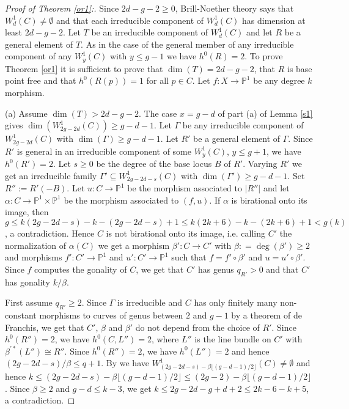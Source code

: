 \documentclass{amsart}
\theoremstyle{plain}
\theoremstyle{definition}
\begin{document}
\begin{proof}[Proof of Theorem \ref{or1}:]
Since $2d-g-2\ge 0$, Brill-Noether theory says that $W^1_d({C}) \ne \emptyset$ and that each irreducible component of $W^1_d({C})$ has dimension at least $2d-g-2$. Let $T$ be an irreducible component of $W^1_d({C})$ and let $R$ be a general element of $T$. As in the case of the general member of any irreducible component of any
$W^1_y({C})$ with $y\le g-1$ we have $h^0({R}) =2$. To prove Theorem \ref{or1} it is sufficient to prove that $\dim (T)=2d-g-2$, that $R$ is base point free and that $h^0(R({p}))=1$ for all $p\in C$. Let $f: X\to \mathbb {P}^1$ be any degree $k$ morphism.


\quad (a) Assume $\dim (T) > 2d-g-2$. The case $x=g-d$ of part (a) of Lemma \ref{s1} gives $\dim (W^1_{2g-2d}({C})) \ge g-d-1$. Let $\Gamma$ be any irreducible component of $W^1_{2g-2d}({C})$ with $\dim (\Gamma)
\ge g-d-1$. Let $R'$ be a general element of $\Gamma $. Since $R'$ is general in an irreducible component of some $W^1_y({C})$, $y\le g+1$, we have $h^0(R') =2$.
Let $s\ge 0$ be the degree of the base locus $B$
of $R'$. Varying $R'$ we get an irreducible family $\Gamma '\subseteq W^1_{2g-2d-s}({C})$ with $\dim (\Gamma ') \ge g-d-1$. Set $R'':= R'(-B)$. Let $u: C\to \mathbb {P}^1$ be the morphism associated
to $|R''|$ and let $\alpha : C\to \mathbb {P}^1\times \mathbb {P}^1$ be the morphism associated to $(f,u)$. If $\alpha$ is birational onto its image,
then $g\le k(2g-2d-s) -k-(2g-2d-s) +1 \le k(2k+6)-k-(2k+6)+1 <g(k)$, a contradiction. 
Hence $C$ is not birational onto its image, i.e. calling $C'$ the normalization of $\alpha ({C})$ we get a morphism $\beta ': C\to C'$ with $\beta : =\deg (\beta ')\ge 2$ and morphisms $f': C'\to \mathbb {P}^1$ and $u': C'\to \mathbb {P}^1$ such that $f = f'\circ \beta '$ and $u = u'\circ \beta '$. Since $f$ computes the gonality of $C$, we get that $C'$ has genus $q_{R'}>0$ and
that $C'$ has gonality $k/\beta$. 


First assume $q_{R'} \ge 2$. Since $\Gamma$ is irreducible and $C$ has only finitely many non-constant morphisms to curves of genus between $2$ and $g-1$ by a theorem of de Franchis, we get that
$C'$, $\beta $ and $\beta '$ do not depend from the choice of $R'$. Since $h^0(R'')=2$, we have $h^0(C,L'')=2$, where $L''$ is the line bundle on $C'$ with $\beta ^{'\ast }(L'')\cong R''$.
Since $h^0(R'')=2$, we have $h^0(L'') =2$ and hence $(2g-2d-s)/\beta \le q+1$.
By \cite[Theorem 1]{fhl} we have $W^1_{(2g-2d-s)-\beta \lfloor (g-d-1)/2\rfloor}({C}) \ne \emptyset$
and hence $k\le (2g-2d-s) -\beta \lfloor (g-d-1)/2\rfloor \le (2g-2) -\beta \lfloor (g-d-1)/2\rfloor$. Since $\beta \ge 2$ and $g-d\le k-3$, we get $k \le 2g-2d -g+d+2
\le 2k-6-k+5$, a contradiction.


\end{proof}
\end{document}
